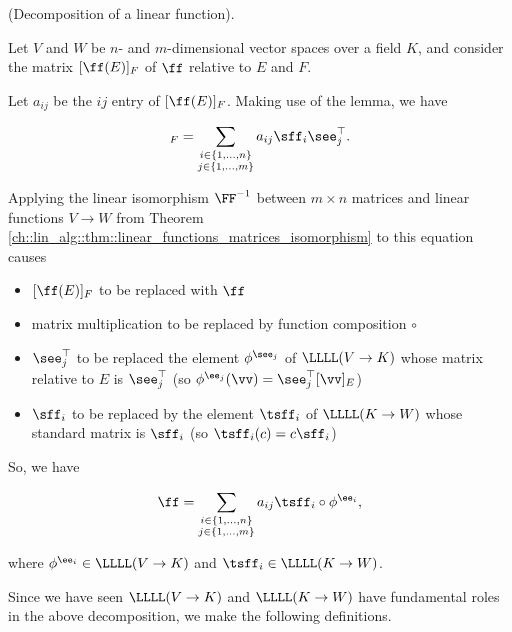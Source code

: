 \begin{deriv}
\label{ch::motivated_intro::deriv::decomposition_of_a_linear_function}
    (Decomposition of a linear function).

    Let $V$ and $W$ be $n$- and $m$-dimensional vector spaces over a field $K$, and consider the matrix $[\ff(E)]_F$ of $\ff$ relative to $E$ and $F$.
    
    Let $a_{ij}$ be the $ij$ entry of $[\ff(E)]_F$. Making use of the lemma, we have

    \begin{align*}
        [\ff(E)]_F = \sum_{\substack{i \in \{1, ..., n\} \\ j \in \{1, ..., m\}}} a_{ij} \sff_i \see_j^\top.
    \end{align*}

    Applying the linear isomorphism $\FF^{-1}$ between $m \times n$ matrices and linear functions $V \rightarrow W$ from Theorem \ref{ch::lin_alg::thm::linear_functions_matrices_isomorphism} to this equation causes  \begin{itemize}
        \item $[\ff(E)]_F$ to be replaced with $\ff$
        \item matrix multiplication to be replaced by function composition $\circ$
        \item $\see_j^\top$ to be replaced the element $\phi^{\see_j}$ of $\LLLL(V \rightarrow K)$ whose matrix relative to $E$ is $\see_j^\top$ (so $\phi^{\ee_j}(\vv) = \see_j^\top [\vv]_E$)
        \item $\sff_i$ to be replaced by the element $\tsff_i$ of $\LLLL(K \rightarrow W)$ whose standard matrix is $\sff_i$ (so $\tsff_i(c) = c\sff_i$)
    \end{itemize}

    So, we have

    \begin{align*}
        \ff = \sum_{\substack{i \in \{1, ..., n\} \\ j \in \{1, ..., m\}}} a_{ij} \tsff_i \circ \phi^{\ee_i},
    \end{align*}

    where $\phi^{\ee_i} \in \LLLL(V \rightarrow K)$ and $\tsff_i \in \LLLL(K \rightarrow W)$.
\end{deriv}

\newpage

Since we have seen $\LLLL(V \rightarrow K)$ and $\LLLL(K \rightarrow W)$ have fundamental roles in the above decomposition, we make the following definitions.

